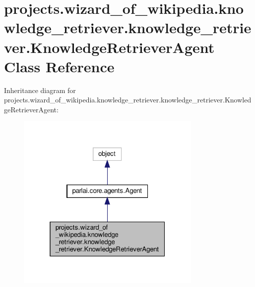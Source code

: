 \hypertarget{classprojects_1_1wizard__of__wikipedia_1_1knowledge__retriever_1_1knowledge__retriever_1_1KnowledgeRetrieverAgent}{}\section{projects.\+wizard\+\_\+of\+\_\+wikipedia.\+knowledge\+\_\+retriever.\+knowledge\+\_\+retriever.\+Knowledge\+Retriever\+Agent Class Reference}
\label{classprojects_1_1wizard__of__wikipedia_1_1knowledge__retriever_1_1knowledge__retriever_1_1KnowledgeRetrieverAgent}


Inheritance diagram for projects.\+wizard\+\_\+of\+\_\+wikipedia.\+knowledge\+\_\+retriever.\+knowledge\+\_\+retriever.\+Knowledge\+Retriever\+Agent\+:
\nopagebreak
\begin{figure}[H]
\begin{center}
\leavevmode
\includegraphics[width=253pt]{d0/d8c/classprojects_1_1wizard__of__wikipedia_1_1knowledge__retriever_1_1knowledge__retriever_1_1Knowle56c07c17dab9d293982156c7cdc81fe0}
\end{center}
\end{figure}


